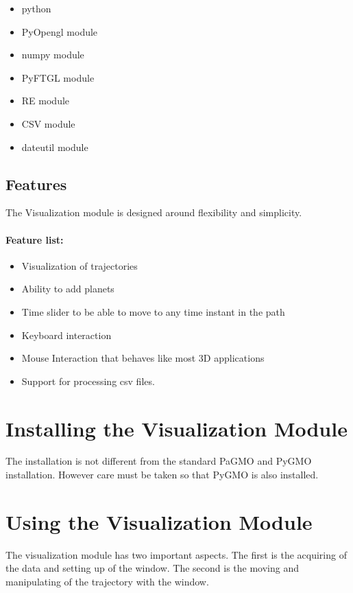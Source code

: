 \documentclass[a4paper,11pt]{article}
\begin{document}
\begin{itemize}
\item \gls{python}
\item PyOpengl module
\item numpy module
\item PyFTGL module
\item RE module
\item CSV module
\item dateutil module
\end{itemize}


\subsection{Features}

The Visualization module is designed around flexibility and simplicity. 

\paragraph{Feature list:}
\begin{itemize}
\item Visualization of trajectories
\item Ability to add planets
\item Time slider to be able to move to any time instant in the path
\item Keyboard interaction
\item Mouse Interaction that behaves like most 3D applications
\item Support for processing \gls{csv} files.
\end{itemize}


\section{Installing the Visualization Module}\label{sec:install}

The installation is not different from the standard \gls{PaGMO} and \gls{PyGMO} installation\cite{install:pagmo}. However care must be taken so that \gls{PyGMO} is also installed.


\section{Using the Visualization Module}

The visualization module has two important aspects. The first is the acquiring of the data and setting up of the window. The second is the moving and manipulating of the trajectory with the window.
\end{document}

